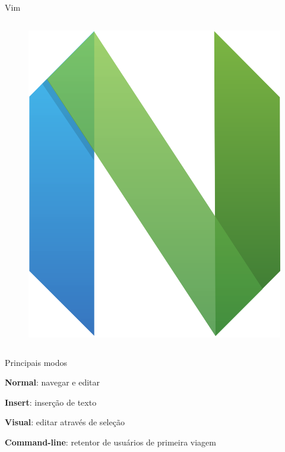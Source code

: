 \begin{frame}{Vim}
\begin{columns}
        \begin{column}{0.3\textwidth}
            \begin{figure}
                \centering
                \includegraphics[height=0.6\linewidth]{Image/neovim-logo.png}
                \label{neovim-logo}
            \end{figure}
        \end{column}
        
    \end{columns}
\end{frame}

\begin{frame}{Principais modos}
    \begin{wideitemize}
        \item \textbf{Normal}: navegar e editar
        \item \textbf{Insert}: inserção de texto
        \item \textbf{Visual}: editar através de seleção
        \item \textbf{Command-line}: retentor de usuários de primeira viagem
    \end{wideitemize}
\end{frame}

